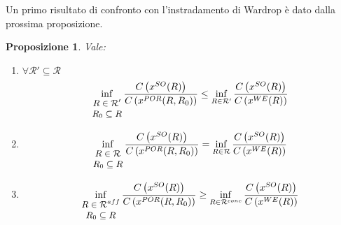 \documentclass[a4paper]{article}
\newcounter{counter1}
\theoremstyle{plain}
\newtheorem{mypro}[counter1]{Proposizione}
\theoremstyle{definition}
\theoremstyle{remark}
\newcommand{\set}[1]{\left\{#1\right\}}
\newcommand{\pa}[1]{\left(#1\right)}
\begin{document}
Un primo risultato di confronto con l'instradamento di Wardrop è dato
dalla prossima proposizione.
\begin{mypro}
Vale:
  \begin{enumerate}
  \item $\forall \mathcal{R}' \subseteq \mathcal{R}$
    \[ \inf _{\small\begin{matrix}R\in \mathcal{R}'\\R_0\subseteq
          R\end{matrix}}
      \frac{C\pa{x^{SO}(R)}}{C\pa{x^{POR}(R,R_0)}} \le
      \inf _{R\in \mathcal{R}'}
      \frac{C\pa{x^{SO}(R)}}{C\pa{x^{WE}(R)}}
    \]
  \item
    \[ \inf _{\small\begin{matrix}R\in \mathcal{R}\\R_0\subseteq
          R\end{matrix}}
      \frac{C\pa{x^{SO}(R)}}{C\pa{x^{POR}(R,R_0)}} =
      \inf _{R\in \mathcal{R}}
      \frac{C\pa{x^{SO}(R)}}{C\pa{x^{WE}(R)}}
    \]
  \item
    \[ \inf _{\small\begin{matrix}R\in \mathcal{R}^{aff}\\R_0\subseteq
          R\end{matrix}}
      \frac{C\pa{x^{SO}(R)}}{C\pa{x^{POR}(R,R_0)}} \ge
      \inf _{R\in \mathcal{R}^{conc}}
      \frac{C\pa{x^{SO}(R)}}{C\pa{x^{WE}(R)}}
    \]
  \end{enumerate}
\end{mypro}
\end{document}

